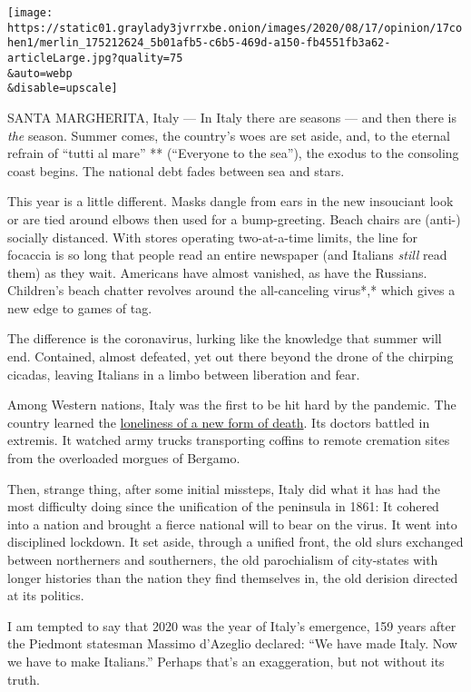 \texttt{[image: https://static01.graylady3jvrrxbe.onion/images/2020/08/17/opinion/17cohen1/merlin\_175212624\_5b01afb5-c6b5-469d-a150-fb4551fb3a62-articleLarge.jpg?quality=75\\\&auto=webp\\\&disable=upscale]}

SANTA MARGHERITA, Italy --- In Italy there are seasons --- and then
there is \emph{the} season. Summer comes, the country's woes are set
aside, and, to the eternal refrain of ``tutti al mare'' ** (``Everyone
to the sea''), the exodus to the consoling coast begins. The national
debt fades between sea and stars.

This year is a little different. Masks dangle from ears in the new
insouciant look or are tied around elbows then used for a bump-greeting.
Beach chairs are (anti-) socially distanced. With stores operating
two-at-a-time limits, the line for focaccia is so long that people read
an entire newspaper (and Italians \emph{still} read them) as they wait.
Americans have almost vanished, as have the Russians. Children's beach
chatter revolves around the all-canceling virus*,* which gives a new
edge to games of tag.

The difference is the coronavirus, lurking like the knowledge that
summer will end. Contained, almost defeated, yet out there beyond the
drone of the chirping cicadas, leaving Italians in a limbo between
liberation and fear.

Among Western nations, Italy was the first to be hit hard by the
pandemic. The country learned the
\href{https://www.nytimes3xbfgragh.onion/interactive/2020/03/27/world/europe/coronavirus-italy-bergamo.html}{loneliness
of a new form of death}. Its doctors battled in extremis. It watched
army trucks transporting coffins to remote cremation sites from the
overloaded morgues of Bergamo.

Then, strange thing, after some initial missteps, Italy did what it has
had the most difficulty doing since the unification of the peninsula in
1861: It cohered into a nation and brought a fierce national will to
bear on the virus. It went into disciplined lockdown. It set aside,
through a unified front, the old slurs exchanged between northerners and
southerners, the old parochialism of city-states with longer histories
than the nation they find themselves in, the old derision directed at
its politics.

I am tempted to say that 2020 was the year of Italy's emergence, 159
years after the Piedmont statesman Massimo d'Azeglio declared: ``We have
made Italy. Now we have to make Italians.'' Perhaps that's an
exaggeration, but not without its truth.


